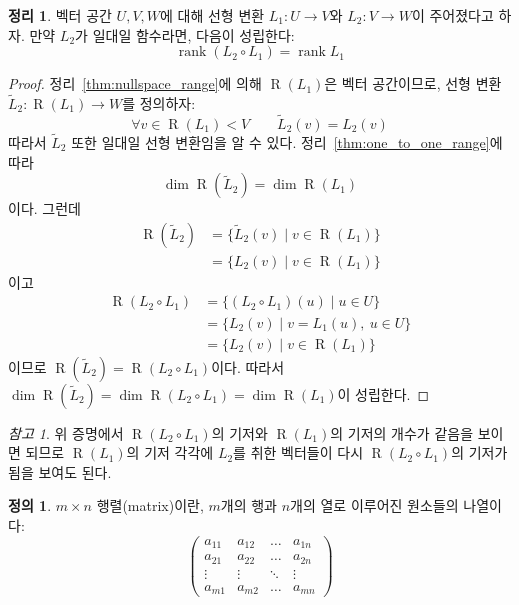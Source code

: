 \documentclass[unfonts,oneside,a4paper]{oblivoir}
\theoremstyle{definition}
\newtheorem{definition}{정의}
\theoremstyle{theorem}
\newtheorem{theorem}{정리}
\theoremstyle{remark}
\newtheorem*{remark}{참고}
\theoremstyle{remark}
\theoremstyle{remark}
\theoremstyle{remark}
\renewcommand{\vec}[1]{\bm{\mathit{#1}}}
\DeclareMathOperator{\Range}{R}
\DeclareMathOperator{\rank}{rank}
\begin{document}
\begin{theorem} \label{thm:one_to_one_rank}
    벡터 공간 $U, V, W$에 대해 선형 변환 $L_1: U \rightarrow V$와 $L_2: V \rightarrow W$이 주어졌다고 하자.
    만약 $L_2$가 일대일 함수라면, 다음이 성립한다:
    \begin{equation*}
        \rank (L_2 \circ L_1) = \rank L_1
    \end{equation*}
\end{theorem}

\begin{proof}
    정리~\ref{thm:nullspace_range}에 의해 $\Range(L_1)$은 벡터 공간이므로, 선형 변환 $\tilde L_2: \Range(L_1) \rightarrow W$를 정의하자:
    \begin{equation*}
        \forall \vec v \in \Range(L_1) < V \qquad \tilde L_2(\vec v) = L_2(\vec v)
    \end{equation*}
    따라서 $\tilde L_2$ 또한 일대일 선형 변환임을 알 수 있다.
    정리~\ref{thm:one_to_one_range}에 따라 
    \begin{equation*}
        \dim \Range(\tilde L_2) = \dim \Range(L_1)
    \end{equation*}
    이다.
    그런데
    \begin{align*}
        \Range(\tilde L_2) &= \{\tilde L_2 (\vec v) \mid \vec v \in \Range(L_1)\}\\
                          &= \{L_2(\vec v) \mid \vec v \in \Range(L_1)\}
    \end{align*}
    이고
    \begin{align*}
        \Range(L_2 \circ L_1) &= \{(L_2 \circ L_1) (\vec u) \mid \vec u \in U\}\\
                        &= \{L_2(\vec v) \mid \vec v = L_1(\vec u),\ \vec u \in U\}\\
                        &= \{L_2(\vec v) \mid \vec v \in \Range(L_1)\}
    \end{align*}
    이므로 $\Range(\tilde L_2) = \Range(L_2 \circ L_1)$이다.
    따라서 $\dim \Range(\tilde L_2) = \dim \Range(L_2 \circ L_1) = \dim \Range(L_1)$이 성립한다.
\end{proof}

\begin{remark}
    위 증명에서 $\Range(L_2 \circ L_1)$의 기저와 $\Range(L_1)$의 기저의 개수가 같음을 보이면 되므로 $\Range(L_1)$의 기저 각각에 $L_2$를 취한 벡터들이 다시 $\Range(L_2 \circ L_1)$의 기저가 됨을 보여도 된다.
\end{remark}

\begin{definition}
    $m \times n$ 행렬(matrix)이란, $m$개의 행과 $n$개의 열로 이루어진 원소들의 나열이다:
    \begin{equation*}
        \begin{pmatrix}
            a_{11} & a_{12} & \dots & a_{1n}\\
            a_{21} & a_{22} & \dots & a_{2n}\\
            \vdots & \vdots & \ddots & \vdots\\
            a_{m1} & a_{m2} & \dots & a_{mn}
        \end{pmatrix}
    \end{equation*}
\end{definition}
\end{document}
